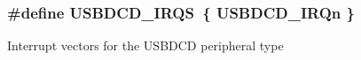 \subsubsection[{\texorpdfstring{U\+S\+B\+D\+C\+D\+\_\+\+I\+R\+QS}{USBDCD_IRQS}}]{\setlength{\rightskip}{0pt plus 5cm}\#define U\+S\+B\+D\+C\+D\+\_\+\+I\+R\+QS~\{ {\bf U\+S\+B\+D\+C\+D\+\_\+\+I\+R\+Qn} \}}\hypertarget{group__USBDCD__Peripheral__Access__Layer_ga052db5d600e4b53eb3e2ea7ef8281b6e}{}\label{group__USBDCD__Peripheral__Access__Layer_ga052db5d600e4b53eb3e2ea7ef8281b6e}
Interrupt vectors for the U\+S\+B\+D\+CD peripheral type 